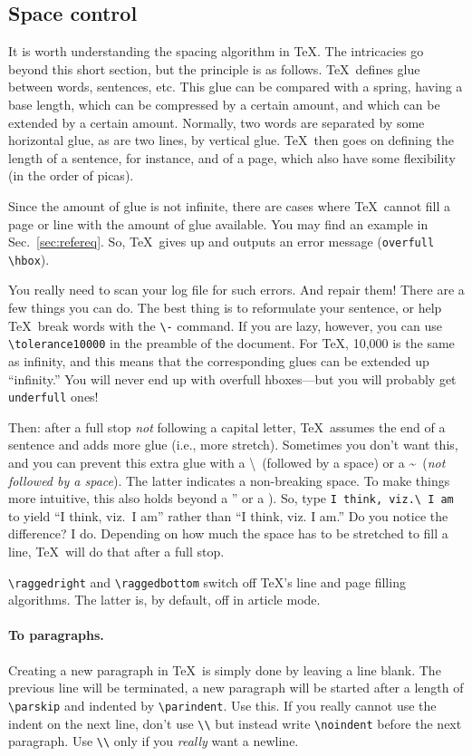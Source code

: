 \documentclass{article}
\begin{document}
\subsection{Space control}
It is worth understanding the spacing algorithm in \TeX. The intricacies go beyond this short section, but the principle is as follows.  \TeX\ defines glue between words, sentences, etc.  This glue can be compared with a spring, having a base length, which can be compressed by a certain amount, and which can be extended by a certain amount.  Normally, two words are separated by some  horizontal glue, as are two lines, by vertical glue.  \TeX\ then goes on defining the length of a sentence, for instance, and of a page, which also have some flexibility (in the order of picas).

Since the amount of glue is not infinite, there are cases where \TeX\ cannot fill a page or line with the amount of glue available.  You may find an example in Sec.~\ref{sec:refereq}.  So, \TeX\ gives up and outputs an error message (\verb+overfull \hbox+).

You really need to scan your log file for such errors.  And repair them!  There are a few things you can do.  The best thing is to reformulate your sentence, or help \TeX\ break words with the \verb+\-+ command.  If you are lazy, however, you can use \verb+\tolerance10000+ in the preamble of the document.  For \TeX, 10,000 is the same as infinity, and this means that the corresponding glues can be extended up ``infinity.''  You will never end up with overfull hboxes---but you will probably get \verb+underfull+ ones!

Then: after a full stop \textsl{not} following a capital letter, \TeX\ assumes the end of a sentence and adds more glue (i.e., more stretch).  Sometimes you don't want this, and you can prevent this extra glue with a \textbackslash\ (followed by a space) or a \textasciitilde\ (\textsl{not followed by a space}). The latter indicates a non-breaking space. To make things more intuitive, this also holds beyond a '' or a ).  So, type \verb+I think, viz.\ I am+ to yield ``I think, viz.\ I am'' rather than ``I think, viz. I am.'' Do you notice the difference?  I do.  Depending on how much the space has to be stretched to fill a line, \TeX\ will do that after a full stop.


\verb+\raggedright+ and \verb+\raggedbottom+ switch off \TeX's line and page filling algorithms. The latter is, by default, off in article mode.


\paragraph{To paragraphs.}
Creating a new paragraph in \TeX\ is simply done by leaving a line blank. The previous line will be terminated, a new paragraph will be started after a  length of \verb+\parskip+ and indented by \verb+\parindent+.  Use this.  If you really cannot use the indent on the next line, don't use \verb+\\+ but instead write  \verb+\noindent+ before the next paragraph.  Use \verb+\\+ only if you \textsl{really} want a newline.
\end{document}
